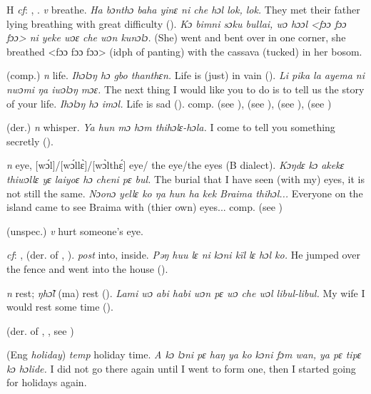 \begin{letter}{H}
 \textit{cf}: , . \textit{v} breathe. \textit{Ha bɔnthɔ baha yinɛ ni che hɔl lok, lok.} They met their father lying breathing with great difficulty (\citealt{Sumner1921}). \textit{Kɔ bimni sɔku bullai, wɔ hɔɔl <fɔɔ fɔɔ fɔɔ> ni yeke wɔɛ che wɔn kunɔlɔ.} (She) went and bent over in one corner, she breathed <fɔɔ fɔɔ fɔɔ> (idph of panting) with the cassava (tucked) in her bosom.

 (comp.) \textit{n} life. \textit{Ihɔlɔŋ hɔ gbo thanthɛn.} Life is (just) in vain (\citealt{Pichl1967}). \textit{Li pika la ayema ni nwɔmi ŋa iwɔlɔŋ mɔɛ.} The next thing I would like you to do is to tell us the story of your life. \textit{Ihɔlɔŋ hɔ imɔl.} Life is sad (\citealt{Pichl1967}). comp.  (see ),  (see ),  (see ),  (see ) 

 (der.) \textit{n} whisper. \textit{Ya hun mɔ hɔm thihɔlɛ-hɔla.} I come to tell you something secretly (\citealt{Pichl1967}). 

 \textit{n} eye, [wɔ́l]/[wɔ́llɛ̀]/[wɔ̀lthɛ́] eye/ the eye/the eyes (B dialect). \textit{Kɔŋdɛ kɔ akekɛ thiwɔllɛ yɛ laiyoɛ hɔ cheni pɛ bul.} The burial that I have seen (with my) eyes, it is not still the same. \textit{Nɔonɔ yellɛ ko ŋa hun ha kek Braima thihɔl...} Everyone on the island came to see Braima with (thier own) eyes... comp.  (see ) 

 (unspec.) \textit{v} hurt someone's eye.

 \textit{cf}: ,  (der. of , ). \textit{post} into, inside. \textit{Pəŋ huu lɛ ni kɔni kïl lɛ hɔl ko.} He jumped over the fence and went into the house (\citealt{Pichl1967}). 

 \textit{n} rest; \textit{ŋhɔ̃l} (ma) rest (\citealt{Pichl1967}). \textit{Lami wɔ abi habi wɔn pɛ wɔ che wɔl libul-libul.} My wife I would rest some time (\citealt{Pichl1967}). 

 (der. of , , see ) 

 (Eng \textit{holiday}) \textit{temp} holiday time. \textit{A kɔ lɔni pɛ haŋ ya ko kɔni fɔm wan, ya pɛ tipɛ kɔ hɔlide.} I did not go there again until I went to form one, then I started going for holidays again.


\end{letter}
